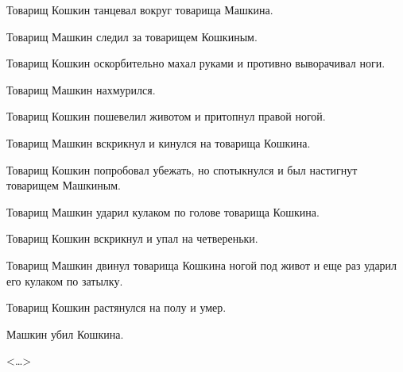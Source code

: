 Товарищ Кошкин танцевал вокруг товарища Машкина.

Товарищ Машкин следил за товарищем Кошкиным.

Товарищ Кошкин оскорбительно махал руками и противно выворачивал ноги.

Товарищ Машкин нахмурился.

Товарищ Кошкин пошевелил животом и притопнул правой ногой.

Товарищ Машкин вскрикнул и кинулся на товарища Кошкина.

Товарищ Кошкин попробовал убежать, но спотыкнулся и был настигнут товарищем Машкиным.

Товарищ Машкин ударил кулаком по голове товарища Кошкина.

Товарищ Кошкин вскрикнул и упал на четвереньки.

Товарищ Машкин двинул товарища Кошкина ногой под живот и еще раз ударил его кулаком по затылку.

Товарищ Кошкин растянулся на полу и умер.
\begin{center}
Машкин убил Кошкина.
\end{center}

\begin{flushright}
<\dots{}>
\end{flushright}